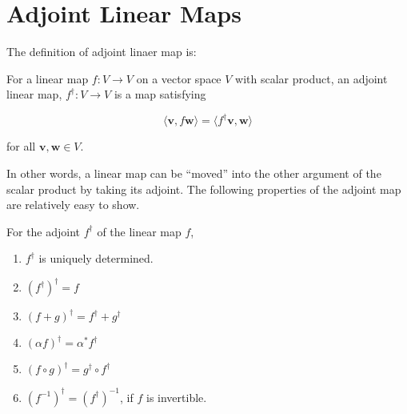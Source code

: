 \documentclass[a4paper,12pt]{report}
\begin{document}
\section{Adjoint Linear Maps}

The definition of adjoint linaer map is:

\begin{definition}
For a linear map \(f : V \to V\) on a vector space \(V\) with scalar product, an adjoint linear map, \(f^\dagger : V \to V\) is a map satisfying
    
    \begin{equation}
    \langle \mathbf{v}, f \mathbf{w} \rangle = \langle f^\dagger \mathbf{v}, \mathbf{w} \rangle
    \end{equation}

for all \(\mathbf{v}, \mathbf{w} \in V\).
\end{definition}
    
In other words, a linear map can be “moved” into the other argument of the scalar product by taking its adjoint. The following properties of the adjoint map are relatively easy to show.
    
\begin{lemma} \label{adjointprop} 
    For the adjoint \(f^{\dagger} \) of the linear map \(f\),  
    \begin{enumerate}[label=(M\arabic*)]
        \item \(f^\dagger\) is uniquely determined.
        \item \((f^\dagger)^\dagger = f\)
        \item \((f+g)^\dagger = f^\dagger + g^\dagger\)
        \item \((\alpha f)^\dagger = \alpha^* f^\dagger\)
        \item \((f \circ g)^\dagger = g^\dagger \circ f^\dagger\)
        \item \((f^{-1})^\dagger = (f^\dagger)^{-1}\), if \(f\) is invertible.
    \end{enumerate}
\end{lemma}
\end{document}

